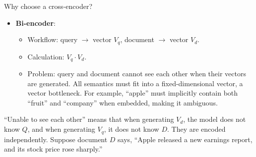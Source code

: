 Why choose a cross-encoder?

\begin{itemize}
\tightlist
\item
{}
  \textbf{Bi-encoder}:

  \begin{itemize}
  \tightlist
  \item
    Workflow: query \(\to\) vector \(V_q\), document \(\to\) vector \(V_d\).
  \item
    Calculation: \(V_q\cdot V_d\).
  \item
    Problem: query and document cannot see each other when their vectors are generated. All semantics must fit into a fixed-dimensional vector, a vector bottleneck. For example, ``apple'' must implicitly contain both ``fruit'' and ``company'' when embedded, making it ambiguous.
  \end{itemize}
\end{itemize}

``Unable to see each other'' means that when generating \(V_d\), the model does not know \(Q\), and when generating \(V_q\), it does not know \(D\). They are encoded independently. Suppose document \(D\) says, ``Apple released a new earnings report, and its stock price rose sharply.''

